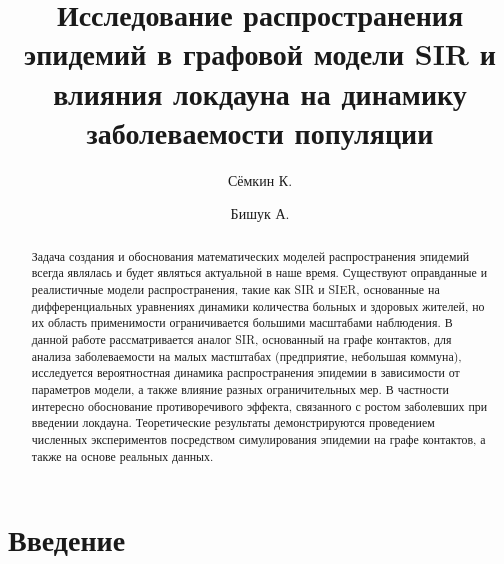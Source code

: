 
\usepackage[backend=biber]{biblatex}

\newcommand{\prob}{\ensuremath{\mathbb{P}}}
\newcommand{\matwait}{\ensuremath{\mathbb{E}}}



\title{Исследование распространения эпидемий в графовой модели SIR и влияния локдауна на динамику заболеваемости популяции}
\author{Сёмкин К. \and Бишук А.}
\date{}


	
	\maketitle
	
	\begin{abstract}
		Задача создания и обоснования математических моделей распространения эпидемий всегда являлась и будет являться актуальной в наше время. Существуют оправданные и реалистичные модели распространения, такие как SIR и SIER, основанные на дифференциальных уравнениях динамики количества больных и здоровых жителей, но их область применимости ограничивается большими масштабами наблюдения. В данной работе рассматривается аналог SIR, основанный на графе контактов, для анализа заболеваемости на малых мастштабах (предприятие, небольшая коммуна), исследуется вероятностная динамика распространения эпидемии в зависимости от параметров модели, а также влияние разных ограничительных мер. В частности интересно обоснование противоречивого эффекта, связанного с ростом заболевших при введении локдауна. Теоретические результаты демонстрируются проведением численных экспериментов посредством симулирования эпидемии на графе контактов, а также на основе реальных данных.
	\end{abstract}
	
	\section*{Введение}
	
